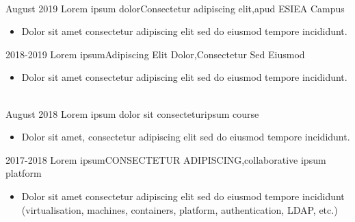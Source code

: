 \begin{experiences}
	
	\vspace{-0.25cm}\\
	\experience
	{August 2019}   {Lorem ipsum dolor}{Consectetur adipiscing elit,}{apud ESIEA Campus}{} {\begin{itemize}
			\item Dolor sit amet consectetur adipiscing elit sed do eiusmod tempore incididunt.
	\end{itemize}}
	{}
	\experience
	{2018-2019}  {Lorem ipsum}{Adipiscing Elit Dolor,}{Consectetur Sed Eiusmod}{} {
		\begin{itemize}
			\item Dolor sit amet consectetur adipiscing elit sed do eiusmod tempore incididunt.
	\end{itemize}}{}
	\vspace{-0.25cm}\\
	\experience
	{August 2018} {Lorem ipsum dolor sit consectetur}{ipsum course}{}    
	{}{
		\begin{itemize}
			\item Dolor sit amet, consectetur adipiscing elit sed do eiusmod tempore incididunt.
	\end{itemize}}
	{}
	\experience
	{2017-2018} {Lorem ipsum}{CONSECTETUR ADIPISCING,}{collaborative ipsum platform}    
	{}{
		\begin{itemize}
			\item Dolor sit amet consectetur adipiscing elit sed do eiusmod tempore incididunt (virtualisation, machines, containers, platform, authentication, LDAP, etc.)
		\end{itemize}   
	} {}
	\\
\end{experiences}
